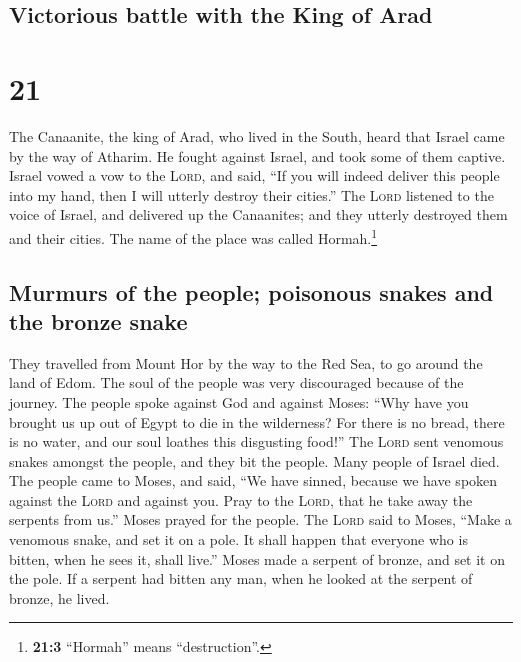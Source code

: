 \hypertarget{victorious-battle-with-the-king-of-arad}{%
\subsection{Victorious battle with the King of
Arad}\label{victorious-battle-with-the-king-of-arad}}

\hypertarget{section-20}{%
\section{21}\label{section-20}}

 The Canaanite, the king of Arad, who lived in the South,
heard that Israel came by the way of Atharim. He fought against Israel,
and took some of them captive.  Israel vowed a vow to the
\textsc{Lord}, and said, ``If you will indeed deliver this people into
my hand, then I will utterly destroy their cities.''  The
\textsc{Lord} listened to the voice of Israel, and delivered up the
Canaanites; and they utterly destroyed them and their cities. The name
of the place was called Hormah.\footnote{\textbf{21:3} ``Hormah'' means
  ``destruction''.}

\hypertarget{murmurs-of-the-people-poisonous-snakes-and-the-bronze-snake}{%
\subsection{Murmurs of the people; poisonous snakes and the bronze
snake}\label{murmurs-of-the-people-poisonous-snakes-and-the-bronze-snake}}

 They travelled from Mount Hor by the way to the Red Sea,
to go around the land of Edom. The soul of the people was very
discouraged because of the journey.  The people spoke
against God and against Moses: ``Why have you brought us up out of Egypt
to die in the wilderness? For there is no bread, there is no water, and
our soul loathes this disgusting food!''  The
\textsc{Lord} sent venomous snakes amongst the people, and they bit the
people. Many people of Israel died.  The people came to
Moses, and said, ``We have sinned, because we have spoken against the
\textsc{Lord} and against you. Pray to the \textsc{Lord}, that he take
away the serpents from us.'' Moses prayed for the people. 
The \textsc{Lord} said to Moses, ``Make a venomous snake, and set it on
a pole. It shall happen that everyone who is bitten, when he sees it,
shall live.''  Moses made a serpent of bronze, and set it
on the pole. If a serpent had bitten any man, when he looked at the
serpent of bronze, he lived.

